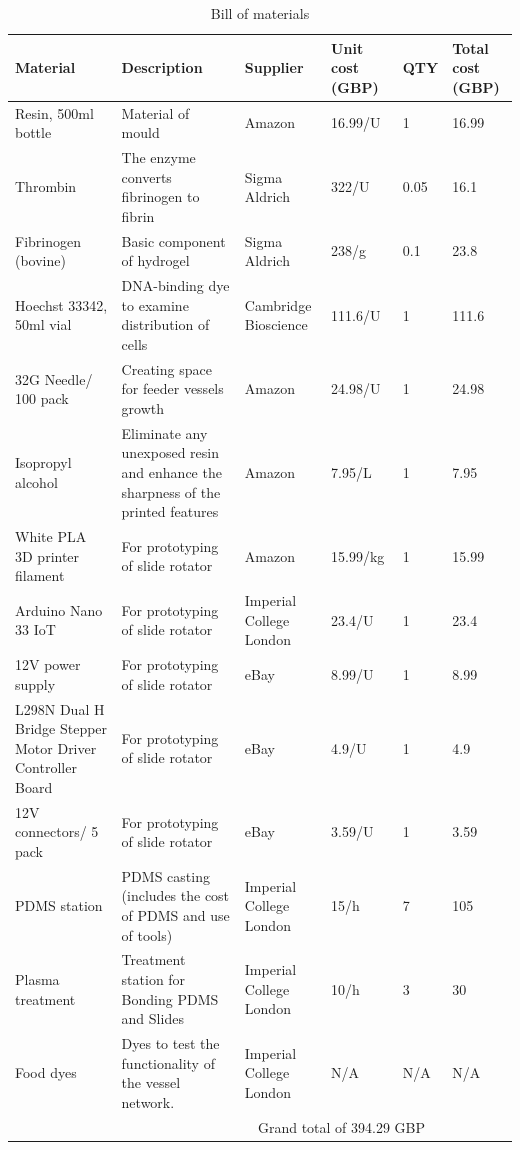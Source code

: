 \documentclass[letterpaper,12pt]{article}
\begin{document}
\begin{table}[!h]
\centering
\caption{Bill of materials}
\label{tab:bill}
\begin{tabular}{|m{4cm} |m{5.5cm} |m{1.8cm} |m{1.5cm} |m{1cm} |m{1.2cm}|} \hline 

\textbf{Material} & \textbf{Description} & \textbf{Supplier} & \textbf{Unit cost (GBP)} & \textbf{QTY} & \textbf{Total cost (GBP)} \\ \hline  \hline 

Resin, 500ml bottle & Material of mould & Amazon & 16.99/U & 1 & 16.99 \\ \hline 

Thrombin & The enzyme converts fibrinogen to fibrin & Sigma Aldrich & 322/U & 0.05 & 16.1 \\ \hline 

Fibrinogen (bovine) & Basic component of hydrogel & Sigma Aldrich & 238/g & 0.1 & 23.8 \\ \hline 

Hoechst 33342, 50ml vial & DNA-binding dye to examine distribution of cells & Cambridge Bioscience & 111.6/U & 1 & 111.6 \\ \hline 

32G Needle/ 100 pack & Creating space for feeder vessels growth & Amazon & 24.98/U & 1 & 24.98 \\ \hline 
Isopropyl alcohol & Eliminate any unexposed resin and enhance the sharpness of the printed features & Amazon & 7.95/L & 1 & 7.95 \\ \hline 

White PLA 3D printer filament & For prototyping of slide rotator & Amazon & 15.99/kg & 1 & 15.99 \\ \hline 
Arduino Nano 33 IoT & For prototyping of slide rotator & Imperial College London & 23.4/U & 1 & 23.4 \\ \hline 
12V power supply & For prototyping of slide rotator & eBay & 8.99/U& 1 & 8.99\\ \hline 
L298N Dual H Bridge Stepper Motor Driver Controller Board & For prototyping of slide rotator & eBay & 4.9/U & 1 & 4.9 \\ \hline 
12V connectors/ 5 pack & For prototyping of slide rotator & eBay & 3.59/U & 1 & 3.59 \\ \hline 
PDMS station & PDMS casting (includes the cost of PDMS and use of tools) & Imperial College London & 15/h & 7 & 105 \\ \hline 
Plasma treatment & Treatment station for Bonding PDMS and Slides & Imperial College London & 10/h & 3 & 30 \\ \hline 

Food dyes & Dyes to test the functionality of the vessel network. & Imperial College London & N/A  & N/A & N/A \\ \hline 
\hline 
 & &   \multicolumn{3}{c}{Grand total of 394.29 GBP} &  \\ \hline

\end{tabular}
\end{table}
\end{document}
